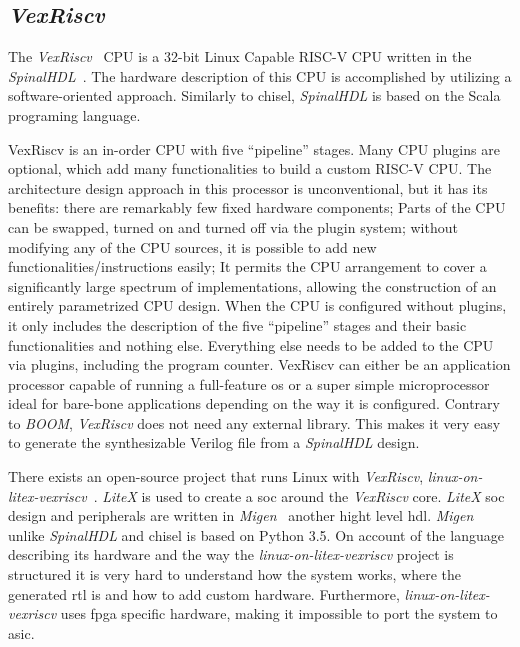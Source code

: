 \subsection{\textit{VexRiscv}}
The \textit{VexRiscv}~\cite{vexriscv} CPU is a 32-bit Linux Capable RISC-V CPU written in the \textit{SpinalHDL}~\cite{papon2017spinalhdl}. The hardware description of this CPU is accomplished by utilizing a software-oriented approach. Similarly to \acrshort{chisel}, \textit{SpinalHDL} is based on the Scala programing language. 

VexRiscv is an in-order CPU with five \enquote{pipeline} stages. Many CPU plugins are optional, which add many functionalities to build a custom RISC-V CPU. The architecture design approach in this processor is unconventional, but it has its benefits: there are remarkably few fixed hardware components; Parts of the CPU can be swapped, turned on and turned off via the plugin system; without modifying any of the CPU sources, it is possible to add new functionalities/instructions easily; It permits the CPU arrangement to cover a significantly large spectrum of implementations, allowing the construction of an entirely parametrized CPU design. When the CPU is configured without plugins, it only includes the description of the five \enquote{pipeline} stages and their basic functionalities and nothing else. Everything else needs to be added to the CPU via plugins, including the program counter. VexRiscv can either be an application processor capable of running a full-feature \acrfull{os} or a super simple microprocessor ideal for bare-bone applications depending on the way it is configured. Contrary to \textit{BOOM}, \textit{VexRiscv} does not need any external library. This makes it very easy to generate the synthesizable Verilog file from a \textit{SpinalHDL} design.

There exists an open-source project that runs Linux with \textit{VexRiscv}, \textit{linux-on-litex-vexriscv}~\cite{litex_vexriscv}. \textit{LiteX} is used to create a \acrfull{soc} around the \textit{VexRiscv} core. \textit{LiteX} \acrshort{soc} design and peripherals are written in \textit{Migen}~\cite{bourdeauducq2012migen} another hight level \acrshort{hdl}. \textit{Migen} unlike \textit{SpinalHDL} and  \acrshort{chisel} is based on Python 3.5. On account of the language describing its hardware and the way the \textit{linux-on-litex-vexriscv} project is structured it is very hard to understand how the system works, where the generated \acrshort{rtl} is and how to add custom hardware. Furthermore, \textit{linux-on-litex-vexriscv} uses \acrshort{fpga} specific hardware, making it impossible to port the system to \acrshort{asic}.

